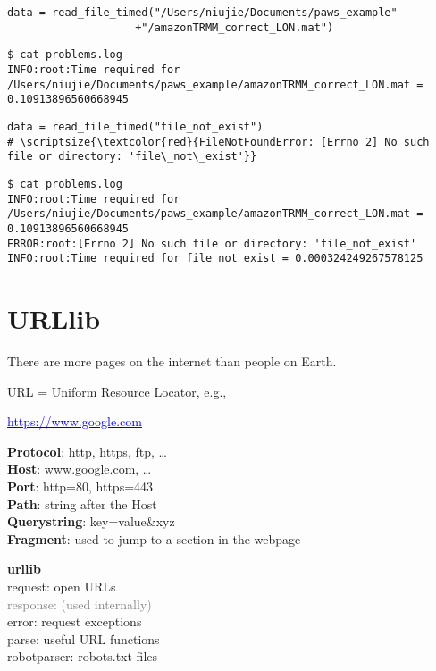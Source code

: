 \documentclass{beamer}
\begin{document}
\begin{frame}[fragile]{}
\begin{verbatim}
data = read_file_timed("/Users/niujie/Documents/paws_example"
                    +"/amazonTRMM_correct_LON.mat")
\end{verbatim}
\begin{verbatim}
$ cat problems.log
INFO:root:Time required for /Users/niujie/Documents/paws_example/amazonTRMM_correct_LON.mat = 0.10913896560668945
\end{verbatim}
\begin{verbatim}
data = read_file_timed("file_not_exist")
# \scriptsize{\textcolor{red}{FileNotFoundError: [Errno 2] No such file or directory: 'file\_not\_exist'}}
\end{verbatim}
\begin{verbatim}
$ cat problems.log
INFO:root:Time required for /Users/niujie/Documents/paws_example/amazonTRMM_correct_LON.mat = 0.10913896560668945
ERROR:root:[Errno 2] No such file or directory: 'file_not_exist'
INFO:root:Time required for file_not_exist = 0.000324249267578125
\end{verbatim}
\end{frame}

\section{URLlib}

\begin{frame}[fragile]{}
There are more pages on the internet than people on Earth.\par
\vspace{10pt}
URL = Uniform Resource Locator, e.g.,\par \vspace{5pt}
\underline{\textcolor{blue}{https://www.google.com}}\par \vspace{5pt}
\textbf{Protocol}: http, https, ftp, \dots\\
\textbf{Host}: www.google.com, \dots\\
\textbf{Port}: http=80, https=443\\
\textbf{Path}: string after the Host\\
\textbf{Querystring}: key=value\&xyz\\
\textbf{Fragment}: used to jump to a section in the webpage \par \vspace{10pt}
\hspace{1cm}\textbf{urllib}\\
request: open URLs\\
\textcolor{gray}{response: (used internally)}\\
error: request exceptions\\
parse: useful URL functions\\
robotparser: robots.txt files
\end{frame}
\end{document}
